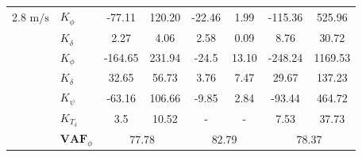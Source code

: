 \begin{table}[]
\begin{tabular}{llcccccc}
    2.8 $\si{\meter\per\second}$ & $K_{\dot{\phi}} $     & -77.11                                     & 120.20                                             & -22.46                                     & 1.99                                               & -115.36                                    & 525.96                                             \\
                                 & $K_{\dot{\delta}}$    & 2.27                                       & 4.06                                               & 2.58                                       & 0.09                                               & 8.76                                       & 30.72                                              \\
                                 & $K_{\phi} $           & -164.65                                    & 231.94                                             & -24.5                                      & 13.10                                              & -248.24                                    & 1169.53                                            \\
                                 & $K_\delta $           & 32.65                                      & 56.73                                              & 3.76                                       & 7.47                                               & 29.67                                      & 137.23                                             \\
                                 & $K_\psi $             & -63.16                                     & 106.66                                             & -9.85                                      & 2.84                                               & -93.44                                     & 464.72                                             \\
                                 & $K_{T_\delta}$        & 3.5                                        & 10.52                                              & -                                          & -                                                  & 7.53                                       & 37.73                                              \\ \cline{2-8} 
                                 & $\mathbf{VAF}_\phi$   & \multicolumn{2}{c}{77.78}                                                                       & \multicolumn{2}{c}{82.79}                                                                       & \multicolumn{2}{c}{78.37}                                                                       \\

\end{tabular}
\end{table}
